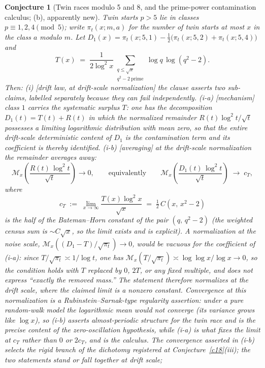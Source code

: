 \documentclass[11pt]{article}
\newtheorem{conjecture}{Conjecture}
\theoremstyle{definition}
\newcommand{\M}{\mathcal M}
\begin{document}
\setcounter{conjecture}{0}%
\begin{conjecture}[Twin races modulo 5 and 8, and the prime-power
contamination calculus; (b), apparently new]\label{c21}
Twin starts $p>5$ lie in classes $p\equiv1,2,4\pmod5$; write $\pi_t(x;m,a)$ for the number of twin starts at most $x$ in the class $a$ modulo $m$.  Let
$D_1(x)=\pi_t(x;5,1)-\tfrac12\bigl(\pi_t(x;5,2)+\pi_t(x;5,4)\bigr)$
and
\[
T(x)\;=\;\frac1{2\log^2x}
\sum_{\substack{q\le\sqrt x\\ q^2-2\ \mathrm{prime}}}
\log q\,\log(q^2-2).
\]
Then:
\emph{(i)} [drift law, at drift-scale normalization] the clause
asserts two sub-claims, labelled separately because they can fail
independently.
\emph{(i-a)} [mechanism] class $1$ carries the systematic surplus
$T$: one has the decomposition $D_1(t)=T(t)+R(t)$ in which the
normalized remainder $R(t)\log^2t/\sqrt t$ possesses a limiting
logarithmic distribution with mean zero, so that the entire drift-scale deterministic content of $D_1$ is the
contamination term and its coefficient is thereby identified.
\emph{(i-b)} [averaging] at the drift-scale normalization the
remainder averages away:
\[
\M_x\!\left(\frac{R(t)\,\log^2t}{\sqrt t}\right)\longrightarrow0,
\qquad\text{equivalently}\qquad
\M_x\!\left(\frac{D_1(t)\,\log^2t}{\sqrt t}\right)
\;\longrightarrow\;c_T,
\]
where
\[
c_T\;:=\;\lim_{x\to\infty}\frac{T(x)\log^2x}{\sqrt x}
\;=\;\tfrac12\,C(x,\,x^2-2)
\]
is the half of the Bateman--Horn constant of the pair $(q,\,q^2-2)$
(the weighted census sum is $\sim C\sqrt x$, so the limit exists and
is explicit).  A normalization
at the noise scale, $\M_x((D_1-T)/\sqrt{\pi_t})\to0$, would be
\emph{vacuous} for the coefficient of (i-a): since
$T/\sqrt{\pi_t}\asymp1/\log t$, one has
$\M_x(T/\sqrt{\pi_t})\asymp\log\log x/\log x\to0$, so the condition
holds with $T$ replaced by $0$, $2T$, or any fixed multiple, and
does not express ``exactly the removed mass.''  The statement
therefore normalizes at the \emph{drift} scale, where the claimed
limit is a nonzero constant.  Convergence at this normalization is a
Rubinstein--Sarnak-type regularity assertion: under a pure
random-walk model the logarithmic mean would not converge (its
variance grows like $\log x$), so (i-b) asserts almost-periodic
structure for the twin race and is the precise content of the
zero-oscillation hypothesis, while (i-a) is what fixes the limit at
$c_T$ rather than $0$ or $2c_T$, and is the calculus.  The
convergence asserted in (i-b) selects the rigid branch of the
dichotomy registered at Conjecture~\ref{c18}(iii); the two
statements stand or fall together at drift scale;

\end{conjecture}
\end{document}
